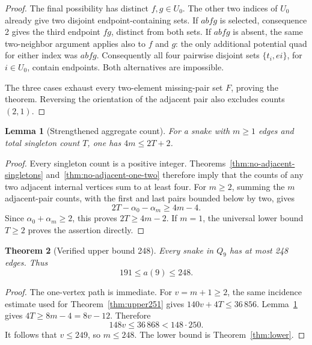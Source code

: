 \documentclass[11pt,a4paper]{article}
\newtheorem{theorem}{Theorem}[section]
\newtheorem{lemma}[theorem]{Lemma}
\theoremstyle{definition}
\theoremstyle{remark}
\newcommand{\Q}{Q}
\begin{document}
\begin{proof}
The final possibility has distinct $f,g\in U_0$. The other two indices of $U_0$ already give two disjoint endpoint-containing sets. If $abfg$ is selected, consequence 2 gives the third endpoint $fg$, distinct from both sets. If $abfg$ is absent, the same two-neighbor argument applies also to $f$ and $g$: the only additional potential quad for either index was $abfg$. Consequently all four pairwise disjoint sets $\{t_i,ei\}$, for $i\in U_0$, contain endpoints. Both alternatives are impossible.

The three cases exhaust every two-element missing-pair set $F$, proving the theorem. Reversing the orientation of the adjacent pair also excludes counts $(2,1)$.
\end{proof}

\begin{lemma}[Strengthened aggregate count]\label{lem:aggregate-four}
For a snake with $m\ge1$ edges and total singleton count $T$, one has $4m\le2T+2$.
\end{lemma}
\begin{proof}
Every singleton count is a positive integer. Theorems~\ref{thm:no-adjacent-singletons} and~\ref{thm:no-adjacent-one-two} therefore imply that the counts of any two adjacent internal vertices sum to at least four. For $m\ge2$, summing the $m$ adjacent-pair counts, with the first and last pairs bounded below by two, gives
\[
2T-\alpha_0-\alpha_m\ge4m-4.
\]
Since $\alpha_0+\alpha_m\ge2$, this proves $2T\ge4m-2$. If $m=1$, the universal lower bound $T\ge2$ proves the assertion directly.
\end{proof}

\begin{theorem}[Verified upper bound 248]\label{thm:upper248}
Every snake in $\Q_9$ has at most 248 edges. Thus
\[
\boxed{191\le a(9)\le248.}
\]
\end{theorem}
\begin{proof}
The one-vertex path is immediate. For $v=m+1\ge2$, the same incidence estimate used for Theorem~\ref{thm:upper251} gives $140v+4T\le36\,856$. Lemma~\ref{lem:aggregate-four} gives $4T\ge8m-4=8v-12$. Therefore
\[
148v\le36\,868<148\cdot250.
\]
It follows that $v\le249$, so $m\le248$. The lower bound is Theorem~\ref{thm:lower}.
\end{proof}
\end{document}

